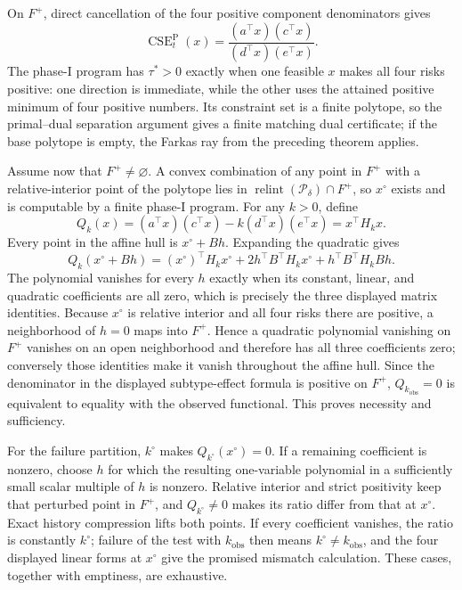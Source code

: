 On \(F^+\), direct cancellation of the four positive component denominators gives
\[
\operatorname{CSE}^{\mathrm P}_t(x)
=\frac{(a^\top x)(c^\top x)}{(d^\top x)(e^\top x)}.
\]
The phase-I program has \(\tau^*>0\) exactly when one feasible \(x\) makes all four risks positive: one direction is immediate, while the other uses the attained positive minimum of four positive numbers.  Its constraint set is a finite polytope, so the primal--dual separation argument gives a finite matching dual certificate; if the base polytope is empty, the Farkas ray from the preceding theorem applies.

Assume now that \(F^+\ne\varnothing\).  A convex combination of any point in \(F^+\) with a relative-interior point of the polytope lies in \(\operatorname{relint}(\mathcal P_\delta)\cap F^+\), so \(x^\circ\) exists and is computable by a finite phase-I program.  For any \(k>0\), define
\[
Q_k(x)=(a^\top x)(c^\top x)-k(d^\top x)(e^\top x)=x^\top H_kx.
\]
Every point in the affine hull is \(x^\circ+Bh\).  Expanding the quadratic gives
\[
Q_k(x^\circ+Bh)
=(x^\circ)^\top H_kx^\circ
+2h^\top B^\top H_kx^\circ+h^\top B^\top H_kBh.
\]
The polynomial vanishes for every \(h\) exactly when its constant, linear, and quadratic coefficients are all zero, which is precisely the three displayed matrix identities.  Because \(x^\circ\) is relative interior and all four risks there are positive, a neighborhood of \(h=0\) maps into \(F^+\).  Hence a quadratic polynomial vanishing on \(F^+\) vanishes on an open neighborhood and therefore has all three coefficients zero; conversely those identities make it vanish throughout the affine hull.  Since the denominator in the displayed subtype-effect formula is positive on \(F^+\), \(Q_{k_{\mathrm{obs}}}=0\) is equivalent to equality with the observed functional.  This proves necessity and sufficiency.

For the failure partition, \(k^\circ\) makes \(Q_{k^\circ}(x^\circ)=0\).  If a remaining coefficient is nonzero, choose \(h\) for which the resulting one-variable polynomial in a sufficiently small scalar multiple of \(h\) is nonzero.  Relative interior and strict positivity keep that perturbed point in \(F^+\), and \(Q_{k^\circ}\ne0\) makes its ratio differ from that at \(x^\circ\).  Exact history compression lifts both points.  If every coefficient vanishes, the ratio is constantly \(k^\circ\); failure of the test with \(k_{\mathrm{obs}}\) then means \(k^\circ\ne k_{\mathrm{obs}}\), and the four displayed linear forms at \(x^\circ\) give the promised mismatch calculation.  These cases, together with emptiness, are exhaustive.

